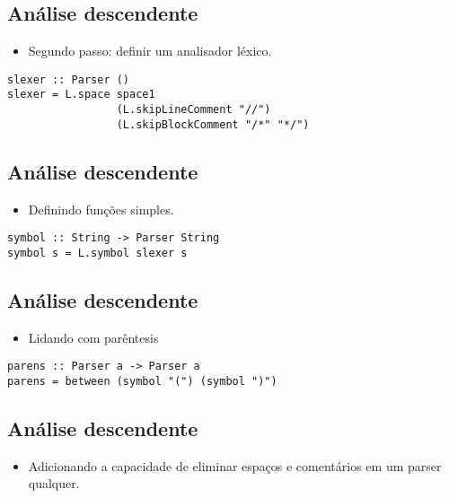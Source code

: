\documentclass[11pt]{article}
\begin{document}
\subsection*{Análise descendente}
\label{sec:orgdfb0065}

\begin{itemize}
\item Segundo passo: definir um analisador léxico.
\end{itemize}

\begin{verbatim}
slexer :: Parser ()
slexer = L.space space1
                 (L.skipLineComment "//")
                 (L.skipBlockComment "/*" "*/")
\end{verbatim}
\subsection*{Análise descendente}
\label{sec:org5da10db}

\begin{itemize}
\item Definindo funções simples.
\end{itemize}

\begin{verbatim}
symbol :: String -> Parser String
symbol s = L.symbol slexer s
\end{verbatim}
\subsection*{Análise descendente}
\label{sec:org0721a7a}

\begin{itemize}
\item Lidando com parêntesis
\end{itemize}

\begin{verbatim}
parens :: Parser a -> Parser a
parens = between (symbol "(") (symbol ")")
\end{verbatim}
\subsection*{Análise descendente}
\label{sec:org444cd86}

\begin{itemize}
\item Adicionando a capacidade de eliminar espaços e comentários em um parser qualquer.
\end{itemize}
\end{document}
